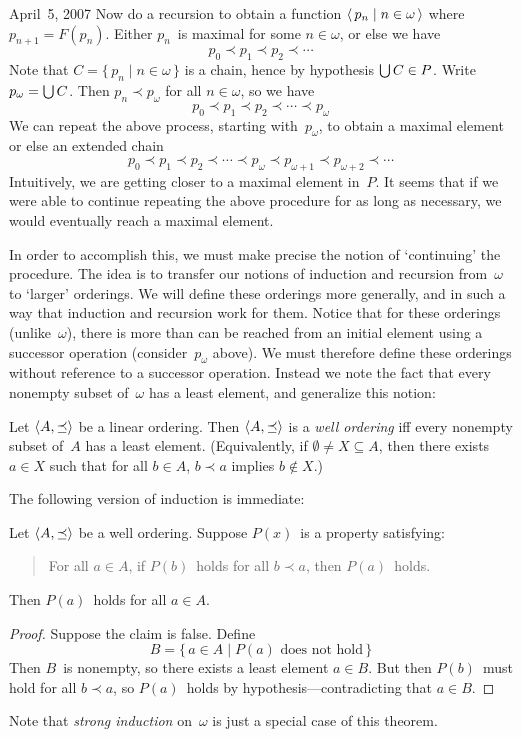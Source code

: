 \begin{lecture}{April~5, 2007}
Now do a recursion to obtain a function \(\langle\,{p_n}\mid{n\in\omega}\,\rangle\) where \(p_{n+1}=F(p_n)\). Either \(p_n\)~is maximal for some \(n\in\omega\), or else we have
\[p_0\prec p_1\prec p_2\prec\cdots\]
Note that \(C=\{\,p_n\mid n\in\omega\,\}\) is a chain, hence by hypothesis \(\bigcup C\in P\). Write \(p_{\omega}=\bigcup C\). Then \(p_n\prec p_{\omega}\) for all \(n\in\omega\), so we have
\[p_0\prec p_1\prec p_2\prec\cdots\prec p_{\omega}\]
We can repeat the above process, starting with~\(p_{\omega}\), to obtain a maximal element or else an extended chain
\[p_0\prec p_1\prec p_2\prec\cdots\prec p_{\omega}\prec p_{\omega+1}\prec p_{\omega+2}\prec\cdots\]
Intuitively, we are getting closer to a maximal element in~\(P\). It seems that if we were able to continue repeating the above procedure for as long as necessary, we would eventually reach a maximal element.

In order to accomplish this, we must make precise the notion of `continuing' the procedure. The idea is to transfer our notions of induction and recursion from~\(\omega\) to `larger' orderings. We will define these orderings more generally, and in such a way that induction and recursion work for them. Notice that for these orderings (unlike~\(\omega\)), there is more than can be reached from an initial element using a successor operation (consider~\(p_{\omega}\) above). We must therefore define these orderings without reference to a successor operation. Instead we note the fact that every nonempty subset of~\(\omega\) has a least element, and generalize this notion:
\begin{defn}
Let \(\langle{A},{\preceq}\rangle\) be a linear ordering. Then \(\langle{A},{\preceq}\rangle\) is a \emph{well ordering} iff every nonempty subset of~\(A\) has a least element. (Equivalently, if \(\emptyset\ne X\subseteq A\), then there exists \(a\in X\) such that for all \(b\in A\), \(b\prec a\) implies \(b\not\in X\).)
\end{defn}
The following version of induction is immediate:
\begin{thm}
Let \(\langle{A},{\preceq}\rangle\) be a well ordering. Suppose \(P(x)\)~is a property satisfying:
\begin{quote}
For all \(a\in A\), if \(P(b)\)~holds for all \(b\prec a\), then \(P(a)\)~holds.
\end{quote}
Then \(P(a)\)~holds for all \(a\in A\).
\end{thm}
\begin{proof}
Suppose the claim is false. Define
\[B=\{\,a\in A\mid P(a)\text{ does not hold}\,\}\]
Then \(B\)~is nonempty, so there exists a least element \(a\in B\). But then \(P(b)\)~must hold for all \(b\prec a\), so \(P(a)\)~holds by hypothesis---contradicting that \(a\in B\).
\end{proof}
\noindent Note that \emph{strong induction} on~\(\omega\) is just a special case of this theorem.


\end{lecture}
